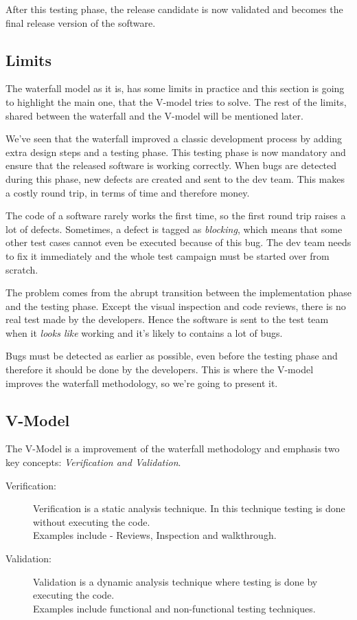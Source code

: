 After this testing phase, the release candidate is now validated and becomes
the final release version of the software.

\subsection{Limits}\label{subsec:limits}
The waterfall model as it is, has some limits in practice and this section is
going to highlight the main one, that the V-model tries to solve.
The rest of the limits, shared between the waterfall and the V-model will be
mentioned later.

We've seen that the waterfall improved a classic development process by
adding extra design steps and a testing phase.
This testing phase is now mandatory and ensure that the released software is
working correctly.
When bugs are detected during this phase, new defects are created and sent to
the dev team.
This makes a costly round trip, in terms of time and therefore money.

The code of a software rarely works the first time, so the first round trip
raises a lot of defects.
Sometimes, a defect is tagged as \textit{blocking}, which means that some other
test cases cannot even be executed because of this bug.
The dev team needs to fix it immediately and the whole test campaign must be
started over from scratch.

The problem comes from the abrupt transition between the implementation phase
and the testing phase.
Except the visual inspection and code reviews, there is no real test made by
the developers.
Hence the software is sent to the test team when it \textit{looks like}
working and it's likely to contains a lot of bugs.

Bugs must be detected as earlier as possible, even before the
testing phase and therefore it should be done by the developers.
This is where the V-model improves the waterfall methodology, so we're going to
present it.

\subsection{V-Model}\label{subsec:v-model}
The V-Model is a improvement of the waterfall methodology and emphasis
two key concepts: \textit{Verification and Validation}.
\begin{description}
    \item[Verification:] Verification is a static analysis technique.
    In this technique testing is done without executing the code. \\
    Examples include - Reviews, Inspection and walkthrough.
    \item[Validation:] Validation is a dynamic analysis technique where
    testing is done by executing the code. \\
    Examples include functional and non-functional testing techniques.
\end{description}

